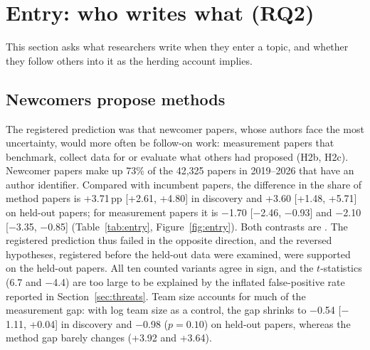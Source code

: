\section{Entry: who writes what (RQ2)}
\label{sec:entry}

This section asks what researchers write when they enter a topic, and whether they follow others into it as the
herding account implies.

\subsection{Newcomers propose methods}
The registered prediction was that newcomer papers, whose authors face the most uncertainty, would more often be
follow-on work: measurement papers that benchmark, collect data for or evaluate what others had proposed (H2b, H2c).
Newcomer papers make up 73\% of the 42,325 papers in 2019--2026 that have an author identifier. Compared with incumbent
papers, the difference in the share of method papers is +3.71\,pp [+2.61, +4.80] in discovery and +3.60 [+1.48, +5.71]
on held-out papers; for measurement papers it is $-$1.70 [$-$2.46, $-$0.93] and $-$2.10 [$-$3.35, $-$0.85]
(Table~\ref{tab:entry}, Figure~\ref{fig:entry}). Both contrasts are . The registered prediction thus
failed in the opposite direction, and the reversed hypotheses, registered before the held-out data were examined, were
supported on the held-out papers. All ten counted variants agree in sign, and the $t$-statistics (6.7 and $-$4.4) are
too large to be explained by the inflated false-positive rate reported in Section~\ref{sec:threats}. Team size accounts
for much of the measurement gap: with log team size as a control, the gap shrinks to $-$0.54 [$-$1.11, +0.04] in
discovery and $-$0.98 ($p = 0.10$) on held-out papers, whereas the method gap barely changes (+3.92 and +3.64).

